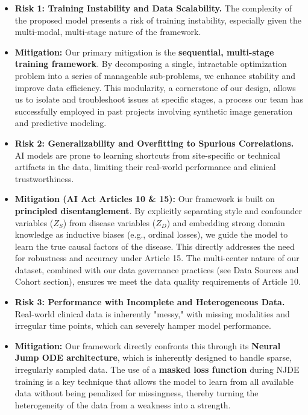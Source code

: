 \documentclass[11pt, a4paper]{article}
\begin{document}
\begin{itemize}
    \item \textbf{Risk 1: Training Instability and Data Scalability.} The complexity of the proposed model presents a risk of training instability, especially given the multi-modal, multi-stage nature of the framework.
    \item \textbf{Mitigation:} Our primary mitigation is the \textbf{sequential, multi-stage training framework}. By decomposing a single, intractable optimization problem into a series of manageable sub-problems, we enhance stability and improve data efficiency. This modularity, a cornerstone of our design, allows us to isolate and troubleshoot issues at specific stages, a process our team has successfully employed in past projects involving synthetic image generation and predictive modeling.

    \item \textbf{Risk 2: Generalizability and Overfitting to Spurious Correlations.} AI models are prone to learning shortcuts from site-specific or technical artifacts in the data, limiting their real-world performance and clinical trustworthiness.
    \item \textbf{Mitigation (AI Act Articles 10 \& 15):} Our framework is built on \textbf{principled disentanglement}. By explicitly separating style and confounder variables ($Z_S$) from disease variables ($Z_D$) and embedding strong domain knowledge as inductive biases (e.g., ordinal losses), we guide the model to learn the true causal factors of the disease. This directly addresses the need for robustness and accuracy under Article 15. The multi-center nature of our dataset, combined with our data governance practices (see Data Sources and Cohort section), ensures we meet the data quality requirements of Article 10.

    \item \textbf{Risk 3: Performance with Incomplete and Heterogeneous Data.} Real-world clinical data is inherently "messy," with missing modalities and irregular time points, which can severely hamper model performance.
    \item \textbf{Mitigation:} Our framework directly confronts this through its \textbf{Neural Jump ODE architecture}, which is inherently designed to handle sparse, irregularly sampled data. The use of a \textbf{masked loss function} during NJDE training is a key technique that allows the model to learn from all available data without being penalized for missingness, thereby turning the heterogeneity of the data from a weakness into a strength.


\end{itemize}
\end{document}
